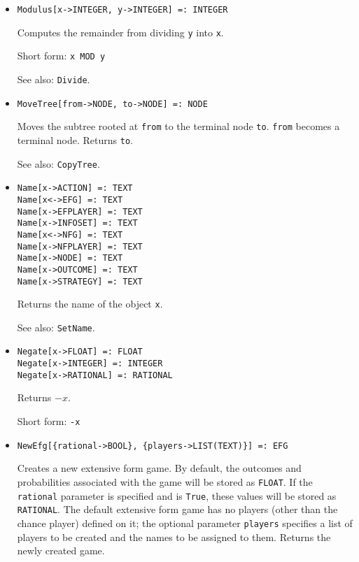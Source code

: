 \begin{itemize}
\item
\protect \large \begin{verbatim}
Modulus[x->INTEGER, y->INTEGER] =: INTEGER
\end{verbatim}\normalsize

\bd
Computes the remainder from dividing \verb+y+ into \verb+x+.
\item
[Short form:] \verb+x MOD y+
\item
[See also:] {\tt Divide}.
\ed


\item
\protect \large \begin{verbatim}
MoveTree[from->NODE, to->NODE] =: NODE
\end{verbatim}\normalsize

\bd
Moves the subtree rooted at \verb+from+ to
the terminal node \verb+to+.  \verb+from+ becomes a terminal node.
Returns \verb+to+.
\item
[See also:] {\tt CopyTree}.
\ed


\item
\protect \large \begin{verbatim}
Name[x->ACTION] =: TEXT
Name[x<->EFG] =: TEXT
Name[x->EFPLAYER] =: TEXT
Name[x->INFOSET] =: TEXT
Name[x<->NFG] =: TEXT
Name[x->NFPLAYER] =: TEXT
Name[x->NODE] =: TEXT
Name[x->OUTCOME] =: TEXT
Name[x->STRATEGY] =: TEXT
\end{verbatim}\normalsize

\bd
Returns the name of the object \verb+x+.
\item
[See also:] {\tt SetName}.
\ed

\item 
\protect \large \begin{verbatim}
Negate[x->FLOAT] =: FLOAT
Negate[x->INTEGER] =: INTEGER
Negate[x->RATIONAL] =: RATIONAL
\end{verbatim} \normalsize

\bd
Returns $-x$.
\item
[Short form:] \verb+-x+
\ed


\item
\protect \large \begin{verbatim} 
NewEfg[{rational->BOOL}, {players->LIST(TEXT)}] =: EFG
\end{verbatim}\normalsize

\bd
Creates a new extensive form game.  By default, the
outcomes and probabilities associated with the game will be stored as
{\tt FLOAT}.  If the \verb+rational+ parameter is specified and is \verb+True+,
these values will be stored as {\tt RATIONAL}.  The default extensive form
game has no players (other than the chance player) defined on it; the
optional parameter \verb+players+ specifies a list of players to be
created and the names to be assigned to them.  Returns the newly created
game.
\ed


\end{itemize}
